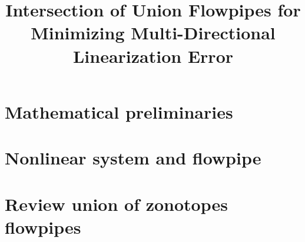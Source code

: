 


\title{Intersection of Union Flowpipes for Minimizing Multi-Directional Linearization Error}
\author{}
\institute{}
%
    
\maketitle

\section{Mathematical preliminaries}


\section{Nonlinear system and flowpipe}


\section{Review union of zonotopes flowpipes}






